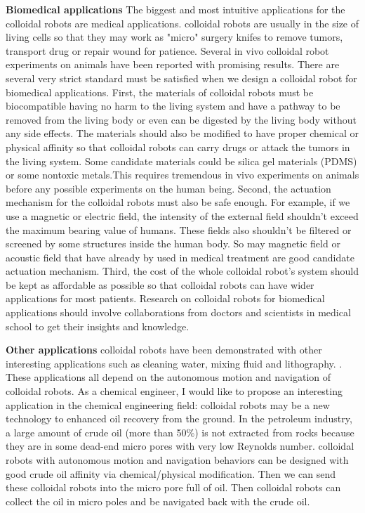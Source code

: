 \textbf{Biomedical applications} The biggest and most intuitive applications for the colloidal robots are medical applications. colloidal robots are usually in the size of living cells so that they may work as "micro" surgery knifes to remove tumors, transport drug or repair wound for patience. Several in vivo colloidal robot experiments  on animals have been reported \autocite{Gao2015,li2018development} with promising results. There are several very strict standard must be satisfied when we design a colloidal robot for biomedical applications. First, the materials of colloidal robots must be biocompatible  having no harm to the living system and have a pathway to be removed from the living body or even can be digested by the living body without any side effects.
The materials should also be modified to have proper chemical or physical affinity so that colloidal robots can carry drugs or attack the tumors in the living system. Some candidate materials could be silica gel materials (PDMS) or some nontoxic metals.This requires tremendous in vivo experiments on animals before  any possible experiments on the human being. Second, the actuation mechanism for the colloidal robots must also be safe enough. For example, if we use a magnetic or electric field, the intensity of the external field shouldn't exceed the maximum bearing value of humans. These fields also shouldn't be  filtered or screened by some structures inside the human body. So may magnetic field or acoustic field that have already by used in medical treatment are good  candidate actuation mechanism.  Third, the cost of the whole colloidal robot's system should be kept as affordable as possible so that colloidal robots can have wider applications for most patients. Research on colloidal robots for biomedical applications should involve collaborations from doctors and scientists in medical school to get their insights and knowledge.

\textbf{Other applications} colloidal robots have been demonstrated with other interesting applications such as cleaning water, mixing fluid and lithography. \autocite{soler2014catalytic,fei2019magneto,li2014nanomotor}. These applications all depend on the autonomous motion and navigation of colloidal robots. As a chemical engineer, I would like to propose an interesting application in the chemical engineering field: colloidal robots may be a new technology to enhanced oil recovery from the ground. In the petroleum industry, a large amount of crude oil (more than 50$\%$) is not extracted from rocks because they are in some dead-end micro pores with very low Reynolds number. colloidal robots with autonomous motion and navigation behaviors can be designed with good crude oil affinity via chemical/physical modification. Then we can send these colloidal robots into the micro pore full of oil.  Then colloidal robots  can collect the oil in micro poles and be navigated back with the crude oil.

